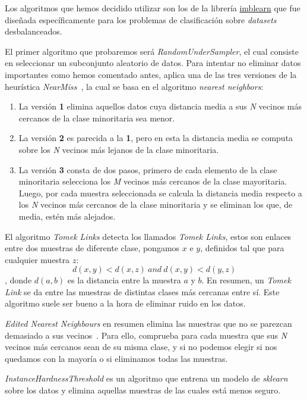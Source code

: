 Los algoritmos que hemos decidido utilizar son los de la librería \href{https://imbalanced-learn.org/stable/}{imblearn} que fue diseñada específicamente para los problemas de clasificación sobre \textit{datasets} desbalanceados.\ \cite{3Undersa98:online}

El primer algoritmo que probaremos será \textit{RandomUnderSampler}, el cual consiste en seleccionar un subconjunto aleatorio de datos. Para intentar no eliminar datos importantes como hemos comentado antes, aplica una de las tres versiones de la heurística \textit{NearMiss}\ \cite{3Undersa98:online}, la cual se basa en el algoritmo \textit{nearest neighbors}:

\begin{enumerate}
    \item La versión \textbf{1} elimina aquellos datos cuya distancia media a sus \textit{N} vecinos más cercanos de la clase minoritaria sea menor.
    \item La versión \textbf{2} es parecida a la \textbf{1}, pero en esta la distancia media se computa sobre los \textit{N} vecinos más lejanos de la clase minoritaria.
    \item La versión \textbf{3} consta de dos pasos, primero de cada elemento de la clase minoritaria selecciona los \textit{M} vecinos más cercanos de la clase mayoritaria. Luego, por cada muestra seleccionada se calcula la distancia media respecto a los \textit{N} vecinos más cercanos de la clase minoritaria y se eliminan los que, de media, estén más alejados.
\end{enumerate}

El algoritmo \textit{Tomek Links} detecta los llamados \textit{Tomek Links}, estos son enlaces entre dos muestras de diferente clase, pongamos \(x\) e \(y\), definidos tal que para cualquier muestra \(z\): 
\[d(x,y) < d(x,z)\ and\ d(x,y) < d(y,z)\], donde \(d(a, b)\) es la distancia entre la muestra \(a\) y \(b\). En resumen, un \textit{Tomek Link} se da entre las muestras de distintas clases más cercanas entre sí. Este algoritmo suele ser bueno a la hora de eliminar ruido en los datos.

\textit{Edited Nearest Neighbours} en resumen elimina las muestras que no se parezcan demasiado a sus vecinos\ \cite{Wil72}. Para ello, comprueba para cada muestra que sus \textit{N} vecinos más cercanos sean de su misma clase, y si no podemos elegir si nos quedamos con la mayoría o si eliminamos todas las muestras.

\textit{InstanceHardnessThreshold} es un algoritmo que entrena un modelo de \textit{sklearn} sobre los datos y elimina aquellas muestras de las cuales está menos seguro.


